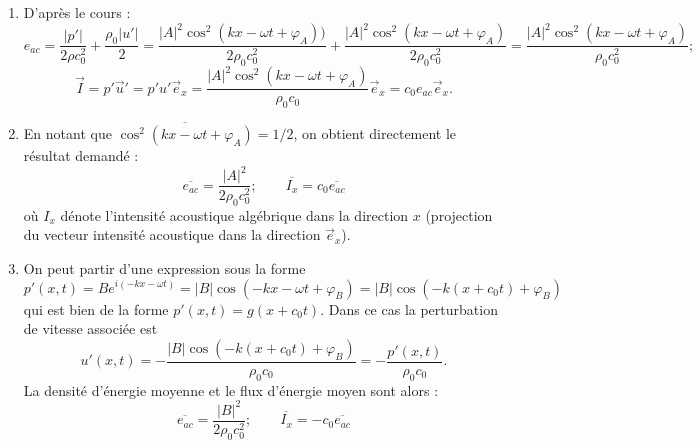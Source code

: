 \documentclass[10pt, a4paper]{article}
\newcommand{\question}[1]{}
\newcommand{\answer}[1]{#1}
\begin{document}
\begin{enumerate}
{Remarque : on peut aussi procéder de même a partir de l'équation de la masse ce qui conduit à la même relation.
}

\item 
\question{Définir l'énergie acoustique volumique $e_{ac}$ et le vecteur intensité acoustique $\vec{I}$. }
\answer{D'après le cours :
$$
e_{ac} = \frac{|p'|}{2 \rho c_0^2} +  \frac{\rho_0 |u'|}{2} = 
\frac{|A|^2  \cos^2 (k x - \omega t+ \varphi_A)) }{2 \rho_0 c_0^2}  
+ \frac{|A|^2  \cos^2 (k x - \omega t+ \varphi_A) }{2 \rho_0 c_0^2}
= 
\frac{|A|^2  \cos^2 (k x - \omega t+ \varphi_A) }{\rho_0 c_0^2} ; 
$$
$$
\vec{I} = p' \vec{u}' =  p' u'  \vec{e}_x = 
\frac{|A|^2  \cos^2 (k x - \omega t+ \varphi_A) }{\rho_0 c_0} \vec e_x  = c_0 e_{ac}  \vec{e}_x.
$$
}



\item \question{Montrez que dans le cas considéré ici, la valeur moyenne de ces quantités (au sens de la moyenne temporelle sur une période d'oscillation) sont données respectivement par :
 
$$
\overline{e_{ac}} = \frac{|A|^2}{2 \rho_0 c_0 ^2} ; \qquad \overline{I_x} = c_0  \overline{e_{ac}} 
$$
}
\answer{ En notant que $\overline{\cos^2 (k x - \omega t+ \varphi_A)} = 1/2$, on obtient directement le résultat demandé :
$$
\overline{e_{ac}} = \frac{|A|^2}{2 \rho_0 c_0 ^2} ; \qquad \overline{I_x} = c_0  \overline{e_{ac}} 
$$
où $I_x$ dénote l'intensité acoustique algébrique dans la direction $x$ (projection du vecteur intensité acoustique dans la direction $\vec{e}_x$).
}


\item 
\question{Comment faut-il modifier les relations données aux questions 2, 3 et 5 pour décrire une onde plane progressive monochromatique d'amplitude $B$ se déplaçant dans la direction $-\vec{e}_x$? }
\answer{
On peut partir d'une expression sous la forme 
$$
p'(x,t) = B e^{i(-k x - \omega t)} =   |B| \cos (-k x - \omega t+ \varphi_B) =  |B| \cos (-k( x + c_0 t)+ \varphi_B) 
$$
qui est bien de la forme $p'(x,t) = g(x+c_0 t)$.
Dans ce cas la perturbation de vitesse associée est 
$$u'(x,t) = -\frac{|B|\cos (-k( x + c_0 t)+ \varphi_B)}{\rho_0 c_ 0} =  -\frac{p'(x,t)}{\rho_0 c_ 0}.$$
La densité d'énergie moyenne et le flux d'énergie moyen sont alors :
$$
\overline{e_{ac}} = \frac{|B|^2}{2 \rho_0 c_0 ^2} ; \qquad \overline{I_x} = - c_0  \overline{e_{ac}} 
$$
}

\question{
\item {\em Question supplémentaire*}.
On reprend l'étude dans le cas d'un {\em solide élastique} de propriétés mécaniques $E$ (module d'Young), $\nu$ (coefficient de Poisson), $\rho_0$ (masse volumique).

}
\end{enumerate}
\end{document}
